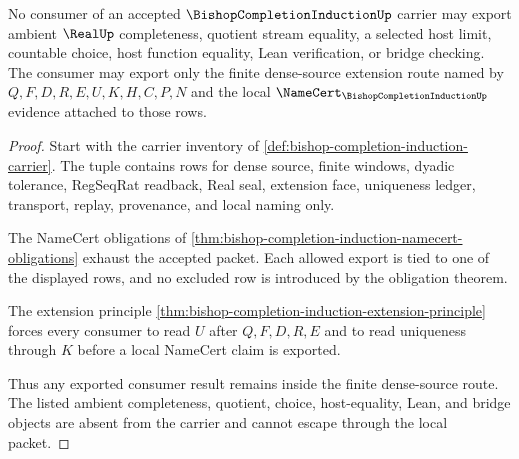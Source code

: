 \begin{theorem}
\label{thm:bishop-completion-induction-consumer-nonescape}
No consumer of an accepted $\BishopCompletionInductionUp$ carrier may export ambient $\RealUp$ completeness, quotient stream equality, a selected host limit, countable choice, host function equality, Lean verification, or bridge checking. The consumer may export only the finite dense-source extension route named by $Q,F,D,R,E,U,K,H,C,P,N$ and the local $\NameCert_{\BishopCompletionInductionUp}$ evidence attached to those rows.
\end{theorem}
\begin{proof}
Start with the carrier inventory of \autoref{def:bishop-completion-induction-carrier}. The tuple contains rows for dense source, finite windows, dyadic tolerance, RegSeqRat readback, Real seal, extension face, uniqueness ledger, transport, replay, provenance, and local naming only.

The NameCert obligations of \autoref{thm:bishop-completion-induction-namecert-obligations} exhaust the accepted packet. Each allowed export is tied to one of the displayed rows, and no excluded row is introduced by the obligation theorem.

The extension principle \autoref{thm:bishop-completion-induction-extension-principle} forces every consumer to read $U$ after $Q,F,D,R,E$ and to read uniqueness through $K$ before a local NameCert claim is exported.

Thus any exported consumer result remains inside the finite dense-source route. The listed ambient completeness, quotient, choice, host-equality, Lean, and bridge objects are absent from the carrier and cannot escape through the local packet.
\end{proof}

